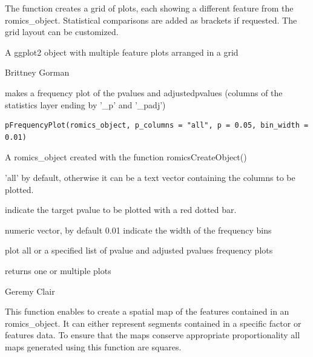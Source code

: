 \documentclass[a4paper]{book}
\begin{document}
%
\begin{Details}
The function creates a grid of plots, each showing a different feature from the romics\_object.
Statistical comparisons are added as brackets if requested. The grid layout can be customized.
\end{Details}
%
\begin{Value}
A ggplot2 object with multiple feature plots arranged in a grid
\end{Value}
%
\begin{Author}
Brittney Gorman
\end{Author}
%
\begin{Description}
makes a frequency plot of the pvalues and adjustedpvalues (columns of the statistics layer ending by '\_p' and '\_padj')
\end{Description}
%
\begin{Usage}
\begin{verbatim}
pFrequencyPlot(romics_object, p_columns = "all", p = 0.05, bin_width = 0.01)
\end{verbatim}
\end{Usage}
%
\begin{Arguments}
\begin{ldescription}
\item[\code{romics\_object}] A romics\_object created with the function romicsCreateObject()

\item[\code{p\_columns}] 'all' by default, otherwise it can be a text vector containing the columns to be plotted.

\item[\code{p}] indicate the target pvalue to be plotted with a red dotted bar.

\item[\code{bin\_width}] numeric vector, by default 0.01 indicate the width of the frequency bins
\end{ldescription}
\end{Arguments}
%
\begin{Details}
plot all or a specified list of pvalue and adjusted pvalues frequency plots
\end{Details}
%
\begin{Value}
returns one or multiple plots
\end{Value}
%
\begin{Author}
Geremy Clair
\end{Author}
%
\begin{Description}
This function enables to create a spatial map of the features contained in an romics\_object. It can either represent segments contained in a specific factor or features data. To ensure that the maps conserve appropriate proportionality all maps generated using this function are squares.
\end{Description}
\end{document}
